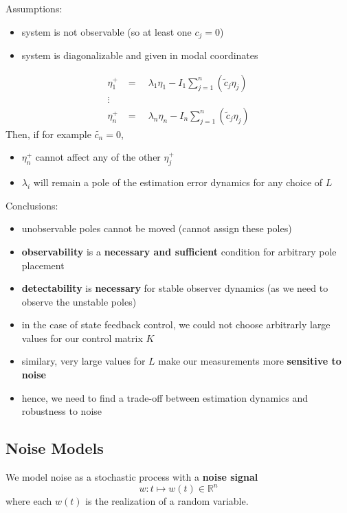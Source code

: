 
Assumptions:
\begin{itemize}
    \item system is not observable (so at least one $c_j=0$)
    \item system is diagonalizable and given in modal coordinates
\end{itemize}
\begin{align*}
    \eta_1^+ & =\quad\lambda_1\eta_1-I_1\sum_{j=1}^n\left(\tilde{c}_j\eta_j\right) \\
    \vdots                                                                         \\
    \eta_n^+ & =\quad\lambda_n\eta_n-I_n\sum_{j=1}^n\left(\tilde{c}_j\eta_j\right)
\end{align*}
Then, if for example $\tilde{c_n}=0$,
\begin{itemize}
    \item $\eta_n^+$ cannot affect any of the other $\eta_j^+$
    \item $\lambda_i$ will remain a pole of the estimation error dynamics for any choice of $L$
\end{itemize}
Conclusions:
\begin{itemize}
    \item unobservable poles cannot be moved (cannot assign these poles)
    \item \textbf{observability} is a \textbf{necessary and sufficient} condition for arbitrary pole placement
    \item \textbf{detectability} is \textbf{necessary} for stable observer dynamics (as we need to observe the unstable poles)
\end{itemize}


\begin{itemize}
    \item in the case of state feedback control, we could not choose arbitrarly large values for our control matrix $K$
    \item similary, very large values for $L$ make our measurements more \textbf{sensitive to noise}
    \item hence, we need to find a trade-off between estimation dynamics and robustness to noise
\end{itemize}


\subsection{Noise Models}
We model noise as a stochastic process with a \textbf{noise signal}
\begin{equation*}
    w:t\mapsto w(t)\in\mathbb{R}^n
\end{equation*}where each $w(t)$ is the realization of a random variable.

